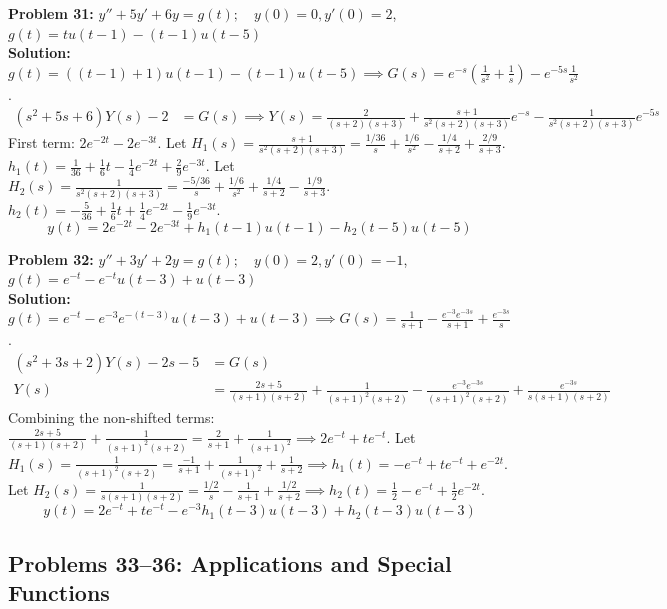 \documentclass[11pt, letterpaper]{article}
\theoremstyle{definition}
\theoremstyle{remark}
\begin{document}
\textbf{Problem 31:} $y''+5y'+6y = g(t); \quad y(0)=0, y'(0)=2$, $g(t) = t u(t-1) - (t-1)u(t-5)$
\\[4pt]
\textbf{Solution:}
$g(t) = ((t-1)+1)u(t-1) - (t-1)u(t-5) \implies G(s) = e^{-s}\left(\frac{1}{s^2} + \frac{1}{s}\right) - e^{-5s}\frac{1}{s^2}$.
\begin{align*}
(s^2+5s+6)Y(s) - 2 &= G(s) \implies Y(s) = \frac{2}{(s+2)(s+3)} + \frac{s+1}{s^2(s+2)(s+3)}e^{-s} - \frac{1}{s^2(s+2)(s+3)}e^{-5s}
\end{align*}
First term: $2e^{-2t} - 2e^{-3t}$.
Let $H_1(s) = \frac{s+1}{s^2(s+2)(s+3)} = \frac{1/36}{s} + \frac{1/6}{s^2} - \frac{1/4}{s+2} + \frac{2/9}{s+3}$.
$h_1(t) = \frac{1}{36} + \frac{1}{6}t - \frac{1}{4}e^{-2t} + \frac{2}{9}e^{-3t}$.
Let $H_2(s) = \frac{1}{s^2(s+2)(s+3)} = \frac{-5/36}{s} + \frac{1/6}{s^2} + \frac{1/4}{s+2} - \frac{1/9}{s+3}$.
$h_2(t) = -\frac{5}{36} + \frac{1}{6}t + \frac{1}{4}e^{-2t} - \frac{1}{9}e^{-3t}$.
\[
y(t) = 2e^{-2t} - 2e^{-3t} + h_1(t-1)u(t-1) - h_2(t-5)u(t-5)
\]

\textbf{Problem 32:} $y''+3y'+2y = g(t); \quad y(0)=2, y'(0)=-1$, $g(t) = e^{-t} - e^{-t}u(t-3) + u(t-3)$
\\[4pt]
\textbf{Solution:}
$g(t) = e^{-t} - e^{-3}e^{-(t-3)}u(t-3) + u(t-3) \implies G(s) = \frac{1}{s+1} - \frac{e^{-3}e^{-3s}}{s+1} + \frac{e^{-3s}}{s}$.
\begin{align*}
(s^2+3s+2)Y(s) - 2s - 5 &= G(s) \\
Y(s) &= \frac{2s+5}{(s+1)(s+2)} + \frac{1}{(s+1)^2(s+2)} - \frac{e^{-3}e^{-3s}}{(s+1)^2(s+2)} + \frac{e^{-3s}}{s(s+1)(s+2)}
\end{align*}
Combining the non-shifted terms: $\frac{2s+5}{(s+1)(s+2)} + \frac{1}{(s+1)^2(s+2)} = \frac{2}{s+1} + \frac{1}{(s+1)^2} \implies 2e^{-t} + te^{-t}$.
Let $H_1(s) = \frac{1}{(s+1)^2(s+2)} = \frac{-1}{s+1} + \frac{1}{(s+1)^2} + \frac{1}{s+2} \implies h_1(t) = -e^{-t} + te^{-t} + e^{-2t}$.
Let $H_2(s) = \frac{1}{s(s+1)(s+2)} = \frac{1/2}{s} - \frac{1}{s+1} + \frac{1/2}{s+2} \implies h_2(t) = \frac{1}{2} - e^{-t} + \frac{1}{2}e^{-2t}$.
\[
y(t) = 2e^{-t} + te^{-t} - e^{-3}h_1(t-3)u(t-3) + h_2(t-3)u(t-3)
\]

\subsection{Problems 33–36: Applications and Special Functions}
\end{document}
